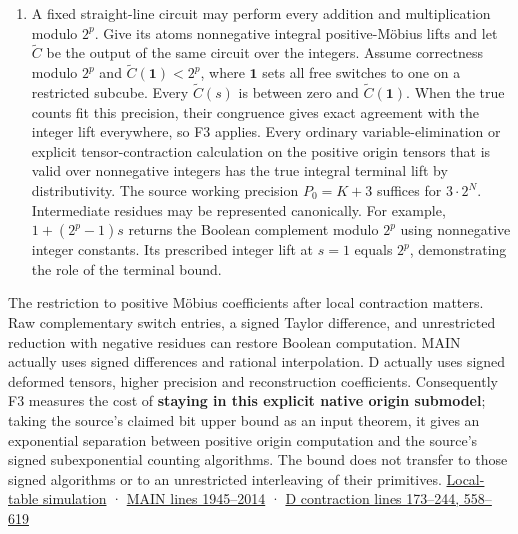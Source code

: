 \documentclass[11pt,a4paper]{article}
\begin{document}
\begin{enumerate}
  executed arithmetic is one correct positive DAG, including distinct
  producers for reused values. Each incoming cache entry must satisfy
  the atom hypothesis or have a charged positive producer DAG valid on
  the same subcube, with the relevant producer control choices covered
  as well. If \(|Q|\le\beta N\), F3 requires \(2^{cN}\) distinct gates
  in the resulting DAG. An execution with fewer gates therefore has no
  such certificate on \(\beta N\) or fewer coordinates, independently of
  the number of plans. This is a dependence statement. One global oracle
  test may have footprint \(N\) in one call. A bound on literal reads
  requires an access model that charges those reads.
\item
  A fixed straight-line circuit may perform every addition and
  multiplication modulo \(2^p\). Give its atoms nonnegative integral
  positive-Möbius lifts and let \(\widetilde C\) be the output of the
  same circuit over the integers. Assume correctness modulo \(2^p\) and
  \(\widetilde C(\mathbf1)<2^p\), where \(\mathbf1\) sets all free
  switches to one on a restricted subcube. Every \(\widetilde C(s)\) is
  between zero and \(\widetilde C(\mathbf1)\). When the true counts fit
  this precision, their congruence gives exact agreement with the
  integer lift everywhere, so F3 applies. Every ordinary
  variable-elimination or explicit tensor-contraction calculation on the
  positive origin tensors that is valid over nonnegative integers has
  the true integral terminal lift by distributivity. The source working
  precision \(P_0=K+3\) suffices for \(3\cdot2^N\). Intermediate
  residues may be represented canonically. For example, \(1+(2^p-1)s\)
  returns the Boolean complement modulo \(2^p\) using nonnegative
  integer constants. Its prescribed integer lift at \(s=1\) equals
  \(2^p\), demonstrating the role of the terminal bound.
\end{enumerate}

The restriction to positive Möbius coefficients after local contraction
matters. Raw complementary switch entries, a signed Taylor difference,
and unrestricted reduction with negative residues can restore Boolean
computation. MAIN actually uses signed differences and rational
interpolation. D actually uses signed deformed tensors, higher precision
and reconstruction coefficients. Consequently F3 measures the cost of
\textbf{staying in this explicit native origin submodel}; taking the
source's claimed bit upper bound as an input theorem, it gives an
exponential separation between positive origin computation and the
source's signed subexponential counting algorithms. The bound does not
transfer to those signed algorithms or to an unrestricted interleaving
of their primitives. \hyperref[v8-section-native-closure]{Local-table
simulation} ·
\href{https://github.com/openai/math/blob/main/preprints/The-Exponential-Time-Hypothesis-is-False-October-25-2026/build/main_full_version.tex\#L1945}{MAIN
lines 1945--2014} ·
\href{https://github.com/openai/math/blob/main/preprints/The-Exponential-Time-Hypothesis-is-False-October-25-2026/build/quantitative-contraction.tex\#L173}{D
contraction lines 173--244, 558--619}
\end{document}
